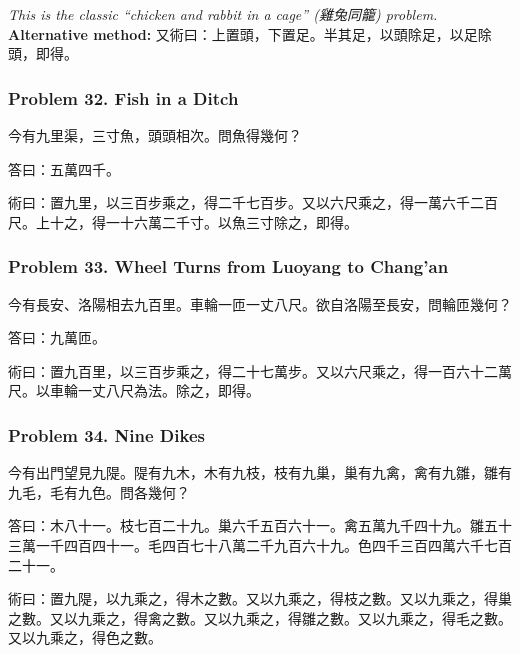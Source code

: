 \documentclass[11pt,a4paper]{article}
\newcommand{\zh}[1]{{\CJKfamily{}#1}}
\begin{document}
\textit{This is the classic ``chicken and rabbit in a cage'' (\zh{雞兔同籠}) problem.}\\
\textbf{Alternative method:} \zh{又術曰：上置頭，下置足。半其足，以頭除足，以足除頭，即得。}

\subsubsection*{Problem 32. Fish in a Ditch}

\begin{problembox}[title=\zh{問}]
\zh{今有九里渠，三寸魚，頭頭相次。問魚得幾何？}
\end{problembox}
\begin{answerbox}[title=\zh{答}]
\zh{答曰：五萬四千。}
\end{answerbox}
\begin{methodbox}[title=\zh{術}]
\zh{術曰：置九里，以三百步乘之，得二千七百步。又以六尺乘之，得一萬六千二百尺。上十之，得一十六萬二千寸。以魚三寸除之，即得。}
\end{methodbox}

\subsubsection*{Problem 33. Wheel Turns from Luoyang to Chang'an}

\begin{problembox}[title=\zh{問}]
\zh{今有長安、洛陽相去九百里。車輪一匝一丈八尺。欲自洛陽至長安，問輪匝幾何？}
\end{problembox}
\begin{answerbox}[title=\zh{答}]
\zh{答曰：九萬匝。}
\end{answerbox}
\begin{methodbox}[title=\zh{術}]
\zh{術曰：置九百里，以三百步乘之，得二十七萬步。又以六尺乘之，得一百六十二萬尺。以車輪一丈八尺為法。除之，即得。}
\end{methodbox}

\subsubsection*{Problem 34. Nine Dikes}

\begin{problembox}[title=\zh{問}]
\zh{今有出門望見九隄。隄有九木，木有九枝，枝有九巢，巢有九禽，禽有九雛，雛有九毛，毛有九色。問各幾何？}
\end{problembox}
\begin{answerbox}[title=\zh{答}]
\zh{答曰：木八十一。枝七百二十九。巢六千五百六十一。禽五萬九千四十九。雛五十三萬一千四百四十一。毛四百七十八萬二千九百六十九。色四千三百四萬六千七百二十一。}
\end{answerbox}
\begin{methodbox}[title=\zh{術}]
\zh{術曰：置九隄，以九乘之，得木之數。又以九乘之，得枝之數。又以九乘之，得巢之數。又以九乘之，得禽之數。又以九乘之，得雛之數。又以九乘之，得毛之數。又以九乘之，得色之數。}
\end{methodbox}
\end{document}
